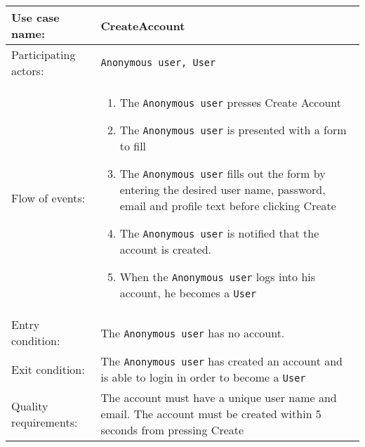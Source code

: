 \documentclass[../report.tex]{subfiles}
\begin{document}
\noindent
\begin{tabular}{| l | p{8cm} |}
  \hline                        
 Use case name:  & CreateAccount   \\   \hline                
 Participating actors:  & \texttt{Anonymous user, User} \\   \hline          
  Flow of events: & \begin{enumerate}
\item{The \texttt{Anonymous user} presses Create Account}
\item{The \texttt{Anonymous user} is presented with a form to fill}
\item{The \texttt{Anonymous user} fills out the form by entering the desired user name, password, email and profile text before clicking Create}
\item{The \texttt{Anonymous user} is notified that the account is created.}
\item{When the \texttt{Anonymous user} logs into his account, he becomes a \texttt{User}}
\end{enumerate}
 \\   \hline 
Entry condition: & The \texttt{Anonymous user} has no account. \\ \hline
Exit condition: & The \texttt{Anonymous user} has created an account and is able to login in order to become a \texttt{User} \\ \hline
Quality requirements: & The account must have a unique user name and email. The account must be created within 5 seconds from pressing Create \\ \hline             
\end{tabular} \\
\end{document}
